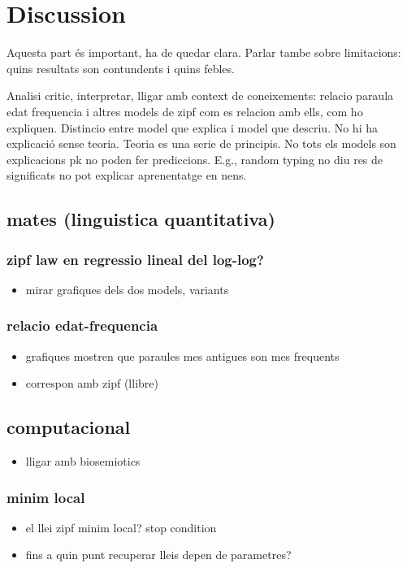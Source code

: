 \chapter{Discussion}
Aquesta part és important, ha de quedar clara. Parlar tambe sobre limitacions: quins resultats son contundents i quins febles.

Analisi critic, interpretar, lligar amb context de coneixements: relacio paraula edat frequencia i altres models de zipf com es relacion amb ells, com ho expliquen. Distincio entre model que explica i model que descriu. No hi ha explicació sense teoria. Teoria es una serie de principis. No tots els models son explicacions pk no poden fer prediccions. E.g., random typing no diu res de significats no pot explicar aprenentatge en nens.
\section{mates (linguistica quantitativa)}
\subsection{zipf law en regressio lineal del log-log?}
\begin{itemize}
\item mirar grafiques dels dos models, variants
\end{itemize}
\subsection{relacio edat-frequencia}
\begin{itemize}
\item grafiques mostren que paraules mes antigues son mes frequents
\item correspon amb zipf (llibre)
\end{itemize}
\section{computacional}
\begin{itemize}
\item lligar amb biosemiotics
\end{itemize}
\subsection{minim local}
\begin{itemize}
\item el llei zipf minim local? stop condition
\item fins a quin punt recuperar lleis depen de parametres?
\end{itemize}
